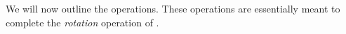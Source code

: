 {We will now outline the operations. These operations are essentially meant to complete the \emph{rotation} operation of \cite{IosifRogalewiczVojnar:deciding}.

}
